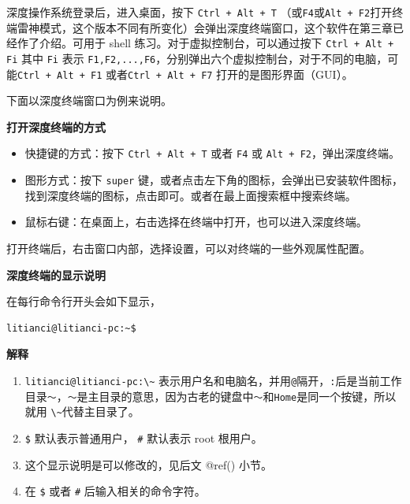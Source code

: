 \documentclass[doctor,openright,twoside]{sjtuthesis}
\providecommand{\tightlist}{%
    \setlength{\itemsep}{0pt}\setlength{\parskip}{0pt}}
\newcommand{\passthrough}[1]{#1}
\theoremstyle{plain}
\theoremstyle{definition}
\theoremstyle{remark}
\theoremstyle{ocrenumbox}
\theoremstyle{plain}
\begin{document}
深度操作系统登录后，进入桌面，按下
\passthrough{\lstinline!Ctrl + Alt + T!}
（或\passthrough{\lstinline!F4!}或\passthrough{\lstinline!Alt + F2!}打开终端雷神模式，这个版本不同有所变化）会弹出深度终端窗口，这个软件在第三章已经作了介绍。可用于
shell 练习。对于虚拟控制台，可以通过按下
\passthrough{\lstinline!Ctrl + Alt + Fi!} 其中
\passthrough{\lstinline!Fi!} 表示
\passthrough{\lstinline!F1,F2,...,F6!}，分别弹出六个虚拟控制台，对于不同的电脑，可能\passthrough{\lstinline!Ctrl + Alt + F1!}
或者\passthrough{\lstinline!Ctrl + Alt + F7!} 打开的是图形界面（GUI）。

下面以深度终端窗口为例来说明。

\textbf{打开深度终端的方式}

\begin{itemize}
\tightlist
\item
  快捷键的方式：按下 \passthrough{\lstinline!Ctrl + Alt + T!} 或者
  \passthrough{\lstinline!F4!} 或
  \passthrough{\lstinline!Alt + F2!}，弹出深度终端。
\item
  图形方式：按下 \passthrough{\lstinline!super!}
  键，或者点击左下角的图标，会弹出已安装软件图标，找到深度终端的图标，点击即可。或者在最上面搜索框中搜索终端。
\item
  鼠标右键：在桌面上，右击选择在终端中打开，也可以进入深度终端。
\end{itemize}

打开终端后，右击窗口内部，选择设置，可以对终端的一些外观属性配置。

\textbf{深度终端的显示说明}

在每行命令行开头会如下显示，

\begin{lstlisting}[language=bash]
litianci@litianci-pc:~$ 
\end{lstlisting}

\textbf{解释}

\begin{enumerate}
\def\labelenumi{\arabic{enumi}.}
\tightlist
\item
  \passthrough{\lstinline!litianci@litianci-pc:\~!}
  表示用户名和电脑名，并用\passthrough{\lstinline!@!}隔开，\passthrough{\lstinline!:!}后是当前工作目录\passthrough{\lstinline!～!}，\passthrough{\lstinline!～!}是主目录的意思，因为古老的键盘中\passthrough{\lstinline!～!}和\passthrough{\lstinline!Home!}是同一个按键，所以就用
  \passthrough{\lstinline!\~!}代替主目录了。
\item
  \passthrough{\lstinline!$!} 默认表示普通用户，
  \passthrough{\lstinline!#!} 默认表示 root 根用户。
\item
  这个显示说明是可以修改的，见后文 @ref() 小节。
\item
  在 \passthrough{\lstinline!$!} 或者 \passthrough{\lstinline!#!}
  后输入相关的命令字符。
\end{enumerate}
\end{document}
